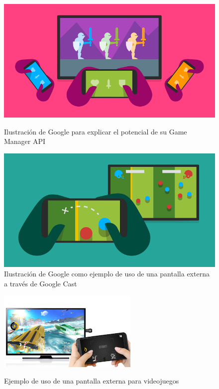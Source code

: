 \begin{figure}[H]
	\centering
	\begin{minipage}[b]{.35\textwidth}
		\includegraphics[scale=0.3]{./Imagenes/games.png}
		\caption{Ilustración de Google para explicar el potencial de su Game Manager API}\label{fig:games}
	\end{minipage}\qquad
	\hspace{2cm}
	\begin{minipage}[b]{.35\textwidth}
		\includegraphics[scale=0.3]{./Imagenes/seconddisplay.png}
		\caption{Ilustración de Google como ejemplo de uso de una pantalla externa a través de Google Cast}\label{fig:seconddisplay}
	\end{minipage}
\end{figure}

\begin{figure}[H]
	\centering
	\includegraphics[width=0.6\textwidth]{./Imagenes/gameexample.jpg}
	\label{fig:fondo}
	\caption{Ejemplo de uso de una pantalla externa para videojuegos}
\end{figure}


